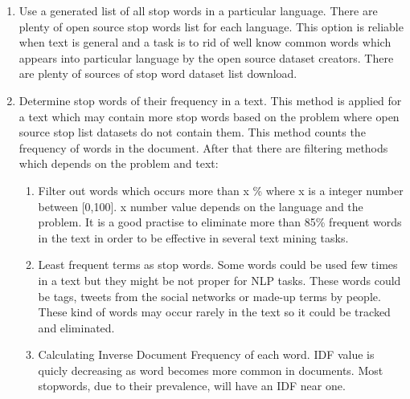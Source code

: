 \begin{enumerate}
    \item Use a generated list of all stop words in a particular language. There are plenty of open source stop words list for each language. This option is reliable when text is general and a task is to rid of well know common words which appears into particular language by the open source dataset creators. There are plenty of sources of stop word dataset list download.
    \item Determine stop words of their frequency in a text. This method is applied for a text which may contain more stop words based on the problem where open source stop list datasets do not contain them. This method counts the frequency of words in the document. After that there are filtering methods which depends on the problem and text:
    \begin{enumerate}
        \item Filter out words which occurs more than x \% where x is a integer number between [0,100]. x number value depends on the language and the problem. It is a good practise to eliminate more than 85\% frequent words in the text in order to be effective in several text mining tasks.
        \item Least frequent terms as stop words. Some words could be used few times in a text but they might be not proper for NLP tasks. These words could be tags, tweets from the social networks or made-up terms by people. These kind of words may occur rarely in the text so it could be tracked and eliminated.
        \item Calculating Inverse Document Frequency of each word. IDF value is quicly decreasing as word becomes more common in documents. Most stopwords, due to their prevalence, will have an IDF near one.
    \end{enumerate}
\end{enumerate}

